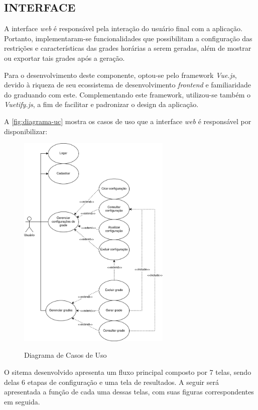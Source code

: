 \clearpage
\subsection{INTERFACE}

A interface \textit{web} é responsável pela interação do usuário final com a aplicação. Portanto, implementaram-se funcionalidades que possibilitam a configuração das restrições e características das grades horárias a serem geradas, além de mostrar ou exportar tais grades após a geração.

Para o desenvolvimento deste componente, optou-se pelo framework \textit{Vue.js}, devido à riqueza de seu ecossistema de desenvolvimento \textit{frontend} e familiaridade do graduando com este. Complementando este framework, utilizou-se também o \textit{Vuetify.js}, a fim de facilitar e padronizar o design da aplicação.

A \autoref{fig:diagrama-uc} mostra os casos de uso que a interface \textit{web} é responsável por disponibilizar:

\begin{figure}[h]
	\centering
	\caption{Diagrama de Casos de Uso}
	\includegraphics[width=0.65\textwidth]{./dados/figuras/diagrama_uc}
	\label{fig:diagrama-uc}
\end{figure}

\newpage
O sitema desenvolvido apresenta um fluxo principal composto por 7 telas, sendo delas 6 etapas de configuração e uma tela de resultados. A seguir será apresentada a função de cada uma dessas telas, com suas figuras correspondentes em seguida.

